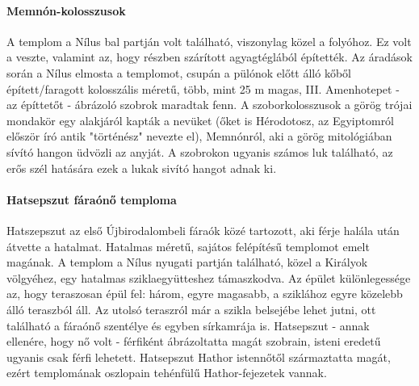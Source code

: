 \clearpage

\begin{figure}
\end{figure} 

\paragraph{Memnón-kolosszusok}
A templom a Nílus bal partján volt található, viszonylag közel a folyóhoz. Ez volt a veszte, valamint az, hogy részben szárított agyagtéglából építették. Az áradások során a Nílus elmosta a templomot, csupán a pülónok előtt álló kőből épített/faragott kolosszális méretű, több, mint 25 m magas, III. Amenhotepet - az építtetőt - ábrázoló szobrok maradtak fenn. A szoborkolosszusok a görög trójai mondakör egy alakjáról kapták a nevüket (őket is Hérodotosz, az Egyiptomról először író antik "történész" nevezte el), Memnónról, aki a görög mitológiában sívító hangon üdvözli az anyját. A szobrokon ugyanis számos luk található, az erős szél hatására ezek a lukak sivító hangot adnak ki.

\begin{figure}
\end{figure} 

\paragraph{Hatsepszut fáraónő temploma}
Hatszepszut az első Újbirodalombeli fáraók közé tartozott, aki férje halála után átvette a hatalmat. Hatalmas méretű, sajátos felépítésű templomot emelt magának. A templom a Nílus nyugati partján található, közel a Királyok völgyéhez, egy hatalmas sziklaegyütteshez támaszkodva. Az épület különlegessége az, hogy teraszosan épül fel: három, egyre magasabb, a sziklához egyre közelebb álló teraszból áll. Az utolsó teraszról már a szikla belsejébe lehet jutni, ott található a fáraónő szentélye és egyben sírkamrája is.
Hatsepszut - annak ellenére, hogy nő volt - férfiként ábrázoltatta magát szobrain, isteni eredetű ugyanis csak férfi lehetett. Hatsepszut Hathor istennőtől származtatta magát, ezért templomának oszlopain tehénfülű Hathor-fejezetek vannak.

